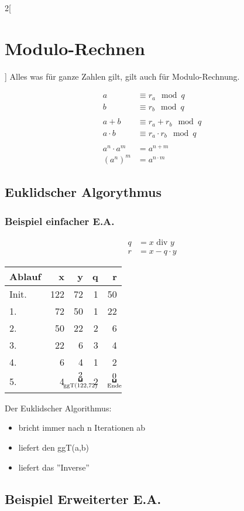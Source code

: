 \begin{multicols}{2}[
	\section{Modulo-Rechnen}
]
	Alles was für ganze Zahlen gilt, gilt auch für Modulo-Rechnung.
	
	\begin{align*}
		a &\equiv r_a \mod q \\
		b &\equiv r_b \mod q \\ \\
		a+b &\equiv r_a + r_b \mod q \\
		a \cdot b &\equiv r_a \cdot r_b \mod q \\ \\
		a^n \cdot a ^ m &= a^{n+m} \\
		(a^n)^m &= a^{n \cdot m}
	\end{align*}

\subsection{Euklidscher Algorythmus}

\subsubsection{Beispiel einfacher E.A.}
	\begin{align*}
		q &= x \text{ div } y \\
		r &= x - q \cdot y
	\end{align*}

	\begin{tabular}{l | r r r r}
		Ablauf & x & y & q & r \\ \hline
		Init. & 122 & 72 & 1 & 50 \\
		1. & 72 & 50 & 1 & 22 \\
		2. & 50 & 22 & 2 & 6 \\
		3. & 22 & 6 & 3 & 4 \\
		4. & 6 & 4 & 1 & 2 \\
		5. & 4 & $\underbracket{2}_{\mathclap{\text{ggT(122,72)}}}$ & 2 & $\underbracket{0}_{\mathclap{\text{Ende}}}$
	\end{tabular}

	Der Euklidscher Algorithmus:
	\begin{itemize}
		\item bricht immer nach n Iterationen ab 
		\item liefert den ggT(a,b)
		\item liefert das ''Inverse''
	\end{itemize}


\subsection{Beispiel Erweiterter E.A.}


\end{multicols}

